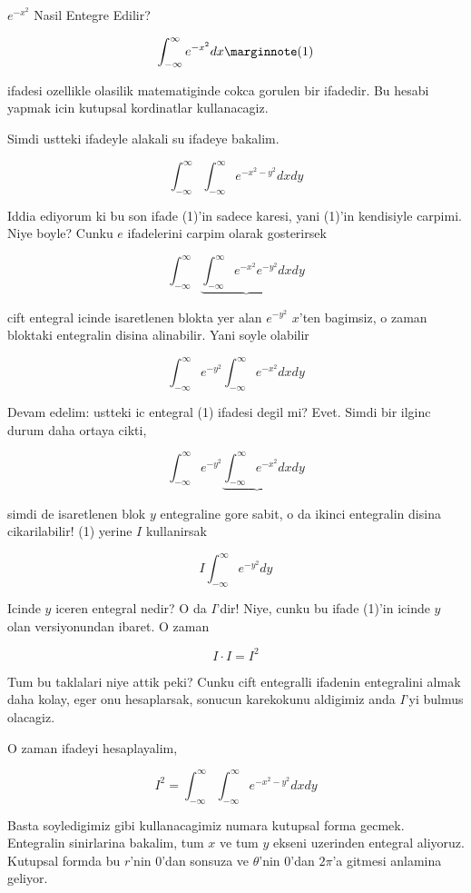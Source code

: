 \documentclass[12pt,fleqn]{article}\usepackage{../common}
\begin{document}
$e^{-x^2}$ Nasil Entegre Edilir? 

\[ \int_{-\infty}^{\infty} e^{-x^2} dx
\mlabel{1} 
\]

ifadesi ozellikle olasilik matematiginde cokca gorulen bir ifadedir. Bu
hesabi yapmak icin kutupsal kordinatlar kullanacagiz. 

Simdi ustteki ifadeyle alakali su ifadeye bakalim. 

\[ \int_{-\infty}^{\infty} \int_{-\infty}^{\infty} e^{-x^2-y^2} dx dy \]

Iddia ediyorum ki bu son ifade (1)'in sadece karesi, yani (1)'in kendisiyle
carpimi. Niye boyle? Cunku $e$ ifadelerini carpim olarak gosterirsek

\[ \int_{-\infty}^{\infty} 
\underbrace{\int_{-\infty}^{\infty} e^{-x^2} e^{-y^2} dx}
dy \]

cift entegral icinde isaretlenen blokta yer alan $e^{-y^2}$ $x$'ten
bagimsiz, o zaman bloktaki entegralin disina alinabilir. Yani soyle olabilir

\[ \int_{-\infty}^{\infty} 
e^{-y^2} \int_{-\infty}^{\infty} e^{-x^2}  dx
dy \]

Devam edelim: ustteki ic entegral (1) ifadesi degil mi? Evet. Simdi bir
ilginc durum daha ortaya cikti, 

\[ \int_{-\infty}^{\infty}  e^{-y^2} 
\underbrace{\int_{-\infty}^{\infty} e^{-x^2}  dx}
dy \]

simdi de isaretlenen blok $y$ entegraline gore sabit, o da ikinci
entegralin disina cikarilabilir! (1) yerine $I$ kullanirsak 

\[ I \int_{-\infty}^{\infty}  e^{-y^2} dy \]

Icinde $y$ iceren entegral nedir? O da $I$'dir! Niye, cunku bu ifade 
(1)'in icinde $y$ olan versiyonundan ibaret. O zaman 

\[ I \cdot I = I^2 \]

Tum bu taklalari niye attik peki? Cunku cift entegralli ifadenin
entegralini almak daha kolay, eger onu hesaplarsak, sonucun karekokunu
aldigimiz anda $I$'yi bulmus olacagiz. 

O zaman ifadeyi hesaplayalim, 

\[ I^2 = \int_{-\infty}^{\infty} \int_{-\infty}^{\infty} e^{-x^2-y^2} dx dy \]

Basta soyledigimiz gibi kullanacagimiz numara kutupsal forma
gecmek. Entegralin sinirlarina bakalim, tum $x$ ve tum $y$ ekseni uzerinden
entegral aliyoruz. Kutupsal formda bu $r$'nin 0'dan sonsuza ve $\theta$'nin
0'dan $2\pi$'a gitmesi anlamina geliyor. 
\end{document}
